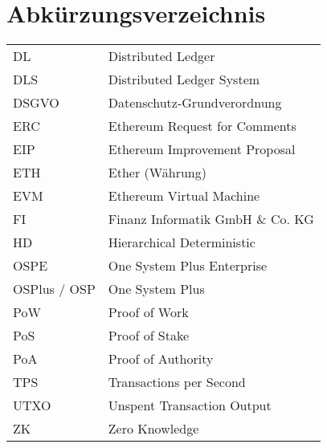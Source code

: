 
\section{Abkürzungsverzeichnis}

\begin{longtable}{p{6 cm}p{9 cm}}
    DL & Distributed Ledger \\
    DLS & Distributed Ledger System \\
    DSGVO & Datenschutz-Grundverordnung \\
    ERC & Ethereum Request for Comments \\
    EIP & Ethereum Improvement Proposal \\
    ETH & Ether (Währung) \\
    EVM & Ethereum Virtual Machine \\
    FI & Finanz Informatik GmbH \& Co. KG \\
    HD & Hierarchical Deterministic \\
    OSPE & One System Plus Enterprise \\
    OSPlus / OSP & One System Plus \\
    PoW & Proof of Work \\
    PoS & Proof of Stake \\
    PoA & Proof of Authority \\
    TPS & Transactions per Second \\
    UTXO & Unspent Transaction Output \\
    ZK & Zero Knowledge \\
\end{longtable}


